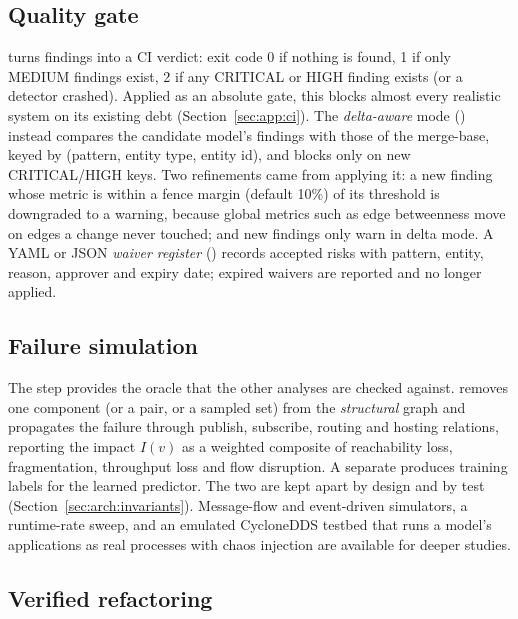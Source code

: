\subsection{Quality gate}
\label{sec:analyses:gate}

 turns findings into a CI verdict: exit code 0 if nothing is found, 1 if only MEDIUM findings exist, 2 if any CRITICAL or HIGH finding exists (or a detector crashed). Applied as an absolute gate, this blocks almost every realistic system on its existing debt (Section~\ref{sec:app:ci}). The \emph{delta-aware} mode () instead compares the candidate model's findings with those of the merge-base, keyed by (pattern, entity type, entity id), and blocks only on new CRITICAL/HIGH keys. Two refinements came from applying it: a new finding whose metric is within a fence margin (default 10\%) of its threshold is downgraded to a warning, because global metrics such as edge betweenness move on edges a change never touched; and new  findings only warn in delta mode. A YAML or JSON \emph{waiver register} () records accepted risks with pattern, entity, reason, approver and expiry date; expired waivers are reported and no longer applied.

\subsection{Failure simulation}
\label{sec:analyses:sim}

The  step provides the oracle that the other analyses are checked against.  removes one component (or a pair, or a sampled set) from the \emph{structural} graph and propagates the failure through publish, subscribe, routing and hosting relations, reporting the impact $I(v)$ as a weighted composite of reachability loss, fragmentation, throughput loss and flow disruption. A separate  produces training labels for the learned predictor. The two are kept apart by design and by test (Section~\ref{sec:arch:invariants}). Message-flow and event-driven simulators, a runtime-rate sweep, and an emulated CycloneDDS testbed that runs a model's applications as real processes with chaos injection are available for deeper studies.

\subsection{Verified refactoring}
\label{sec:analyses:prescribe}

